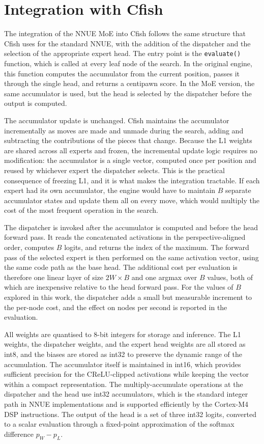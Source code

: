 \section{Integration with Cfish}

The integration of the NNUE MoE into Cfish follows the same structure that Cfish uses for the standard NNUE, with the addition of the dispatcher and the selection of the appropriate expert head. The entry point is the \texttt{evaluate()} function, which is called at every leaf node of the search. In the original engine, this function computes the accumulator from the current position, passes it through the single head, and returns a centipawn score. In the MoE version, the same accumulator is used, but the head is selected by the dispatcher before the output is computed.

The accumulator update is unchanged. Cfish maintains the accumulator incrementally as moves are made and unmade during the search, adding and subtracting the contributions of the pieces that change. Because the L1 weights are shared across all experts and frozen, the incremental update logic requires no modification: the accumulator is a single vector, computed once per position and reused by whichever expert the dispatcher selects. This is the practical consequence of freezing L1, and it is what makes the integration tractable. If each expert had its own accumulator, the engine would have to maintain $B$ separate accumulator states and update them all on every move, which would multiply the cost of the most frequent operation in the search.

The dispatcher is invoked after the accumulator is computed and before the head forward pass. It reads the concatenated activations in the perspective-aligned order, computes $B$ logits, and returns the index of the maximum. The forward pass of the selected expert is then performed on the same activation vector, using the same code path as the base head. The additional cost per evaluation is therefore one linear layer of size $2W \times B$ and one argmax over $B$ values, both of which are inexpensive relative to the head forward pass. For the values of $B$ explored in this work, the dispatcher adds a small but measurable increment to the per-node cost, and the effect on nodes per second is reported in the evaluation.

All weights are quantised to 8-bit integers for storage and inference. The L1 weights, the dispatcher weights, and the expert head weights are all stored as int8, and the biases are stored as int32 to preserve the dynamic range of the accumulation. The accumulator itself is maintained in int16, which provides sufficient precision for the CReLU-clipped activations while keeping the vector within a compact representation. The multiply-accumulate operations at the dispatcher and the head use int32 accumulators, which is the standard integer path in NNUE implementations and is supported efficiently by the Cortex-M4 DSP instructions. The output of the head is a set of three int32 logits, converted to a scalar evaluation through a fixed-point approximation of the softmax difference $p_W - p_L$.


